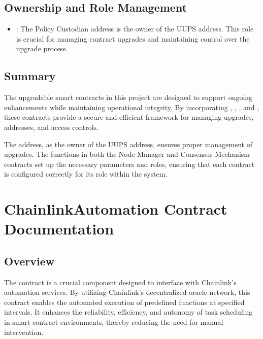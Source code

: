 \documentclass[a4paper,10pt,english]{sphinxmanual}
\begin{document}
\section{Ownership and Role Management}
\label{\detokenize{docs_upgradable_contract:ownership-and-role-management}}
\sphinxAtStartPar
{}
\begin{itemize}
\item {} 
\sphinxAtStartPar
{}: The Policy Custodian address is the owner of the UUPS address. This role is crucial for managing contract upgrades and maintaining control over the upgrade process.

\end{itemize}


\section{Summary}
\label{\detokenize{docs_upgradable_contract:summary}}
\sphinxAtStartPar
The upgradable smart contracts in this project are designed to support ongoing enhancements while maintaining operational integrity. By incorporating , , , and , these contracts provide a secure and efficient framework for managing upgrades, addresses, and access controls.

\sphinxAtStartPar
The  address, as the owner of the UUPS address, ensures proper management of upgrades. The  functions in both the Node Manager and Consensus Mechanism contracts set up the necessary parameters and roles, ensuring that each contract is configured correctly for its role within the system.

\sphinxstepscope


\chapter{ChainlinkAutomation Contract Documentation}
\label{\detokenize{docs_chainlink_automation_contract:chainlinkautomation-contract-documentation}}\label{\detokenize{docs_chainlink_automation_contract::doc}}

\section{Overview}
\label{\detokenize{docs_chainlink_automation_contract:overview}}
\sphinxAtStartPar
The  contract is a crucial component designed to interface with Chainlink’s automation services. By utilizing Chainlink’s decentralized oracle network, this contract enables the automated execution of predefined functions at specified intervals. It enhances the reliability, efficiency, and autonomy of task scheduling in smart contract environments, thereby reducing the need for manual intervention.
\end{document}
